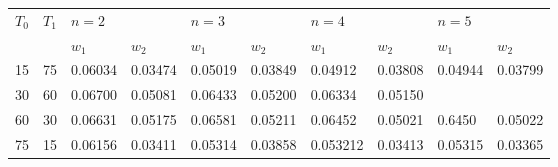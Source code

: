 \documentclass[journal]{new-aiaa}
\begin{document}
\begin{table}[!h]
	\begin{tabular}{@{}llllllllll@{}}
		\hline
		\multirow{ 2}{*}{$T_0$}
		&
		\multirow{ 2}{*}{$T_1$}
		& \multicolumn{2}{l}{$n=2$}                                        & \multicolumn{2}{l}{$n=3$}                                                                            & \multicolumn{2}{l}{$n=4$}                                                                            & \multicolumn{2}{l}{$n=5$}                                                                            \\ \cline{3-10}

	{}	         & {}     &$w_1$ &$w_2$  &$w_1$ &$w_2$  &$w_1$  &$w_2$ &$w_1$  &$w_2$ \\ \hline
		15         & 75        & 0.06034
                                                 &  0.03474                                                & 0.05019                                                 & 0.03849                                                 & 0.04912                                                 & 0.03808                                                 & 0.04944                                                 & 0.03799                                                 \\
		30         & 60        & 0.06700                                                 & 0.05081                                                 &0.06433                                                  & 0.05200                                                  &0.06334                                                  & 0.05150                                                 &                                                  &                                                  \\ 
		60         & 30        & 0.06631                                                 &0.05175                                                  &0.06581                                                    & 0.05211                                                 &  0.06452                                             &  0.05021                                                & 0.6450                                                 &0.05022                                                  \\ 
		75         & 15        &0.06156                                                  &0.03411                                                  & 0.05314                                                  & 0.03858                                                  & 0.053212                                                 & 0.03413                                                 & 0.05315                                                 & 0.03365                                                 \\ 

\end{tabular}
\end{table}
\end{document}
